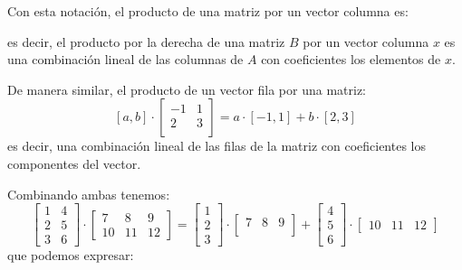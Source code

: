 \documentclass[12pt]{article}
\begin{document}
Con esta notación, el producto de una matriz por un vector
columna es:
\begin{center}
\end{center}
es decir, el producto por la derecha de una matriz $B$ por un
vector columna $x$ es una combinación lineal de las columnas de
$A$ con coeficientes los elementos de $x$.

De manera similar, el producto de un vector fila por una matriz:$$\left[a,b\right]\cdot\begin{bmatrix}
    -1 & 1\\
    2 & 3\\
\end{bmatrix}=a\cdot\left[-1,1\right]+b\cdot\left[2,3\right]$$
es decir, una combinación lineal de las filas de la matriz con
coeficientes los componentes del vector.

Combinando ambas tenemos:
\[\begin{bmatrix}
1 & 4 \\ 
2 & 5 \\ 
3 & 6
\end{bmatrix}\cdot\begin{bmatrix}
7 & 8 & 9 \\ 
10 & 11 & 12
\end{bmatrix}=\begin{bmatrix}
1\\
2\\
3
\end{bmatrix}\cdot\begin{bmatrix}
7 & 8 & 9\\
\end{bmatrix}+\begin{bmatrix}
4 \\ 
5 \\ 
6
\end{bmatrix}\cdot\begin{bmatrix}
10 & 11 & 12
\end{bmatrix}\] que podemos expresar:
\end{document}
